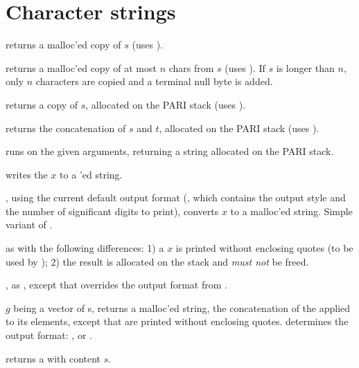 \section{Character strings}


 returns a malloc'ed copy of $s$
(uses ).

 returns a malloc'ed copy of
at most $n$ chars from $s$ (uses ). If $s$ is longer than
$n$, only $n$ characters are copied and a terminal null byte is added.

 returns a copy of $s$, allocated
on the PARI stack (uses ).

 returns the
concatenation of $s$ and $t$, allocated on the PARI stack (uses
).

 runs 
on the given arguments, returning a string allocated on the PARI stack.

 writes the  $x$ to a 'ed
string.

, using the current default output format
(, which contains the output style and the number of
significant digits to print), converts $x$ to a malloc'ed string. Simple
variant of .

 as  with the following
differences: 1) a  $x$ is printed without enclosing quotes
(to be used by ); 2) the result is allocated on the stack
and \emph{must not} be freed.

, as , except that
 overrides the output format from .

 $g$ being a vector of s,
returns a malloc'ed string, the concatenation of the  applied
to its elements, except that  are printed without enclosing quotes.
 determines the output format: , 
or .


 returns a  with content $s$.

